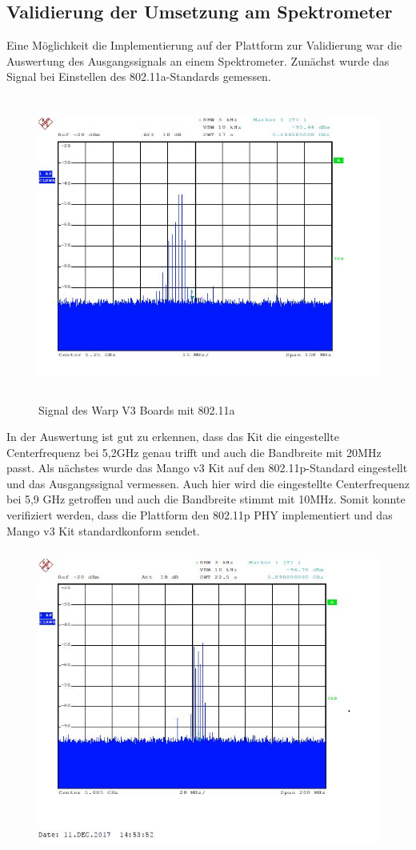 \documentclass[letterpaper,11pt,ngerman]{article}
\begin{document}
\begin{onehalfspace}
\subsection{Validierung der Umsetzung am Spektrometer}
Eine Möglichkeit die Implementierung auf der Plattform zur Validierung war die Auswertung des Ausgangssignals an einem Spektrometer. Zunächst wurde das Signal bei Einstellen des 802.11a-Standards gemessen.
\begin{figure}[H]
\begin{center}
\includegraphics[width = 16cm,height=10cm]{80211a.jpg}
\caption{Signal des Warp V3 Boards mit 802.11a}
\label{fig6}
\end{center}
\end{figure}
\noindent In der Auswertung ist gut zu erkennen, dass das Kit die eingestellte Centerfrequenz bei 5,2GHz genau  trifft und auch die Bandbreite mit 20MHz passt. Als nächstes wurde das Mango v3 Kit auf den 802.11p-Standard eingestellt und das Ausgangssignal vermessen. Auch hier wird die eingestellte Centerfrequenz bei 5,9 GHz getroffen und auch die Bandbreite stimmt mit 10MHz. Somit konnte verifiziert werden, dass die Plattform den 802.11p PHY implementiert und das Mango v3 Kit standardkonform sendet.
\begin{figure}[H]
\begin{center}
\includegraphics[width = 16cm,height=10cm]{80211p.jpg}

\end{center}
\end{figure}
\end{onehalfspace}
\end{document}
